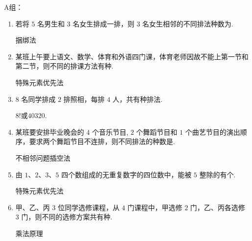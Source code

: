 A组：
\begin{enumerate}

\item 若将 $5$ 名男生和 $3$ 名女生排成一排，则 $3$ 名女生相邻的不同排法种数为.
\begin{jieda}
    捆绑法
\end{jieda}

\item 某班上午要上语文、数学、体育和外语四门课，体育老师因故不能上第一节和第二节，则不同的排课方法有种.
\begin{jieda}
    特殊元素优先法
\end{jieda}


\item $8$ 名同学排成 $2$ 排照相，每排 $4$ 人，共有种排法.
\begin{jieda}
    $8!$或$40320$.
\end{jieda}

\item 某班要安排毕业晚会的 $4$ 个音乐节目, $2$ 个舞蹈节目和 $1$ 个曲艺节目的演出顺序，要求两个舞蹈节目不连排，则不同排法的种数是.
\begin{jieda}
    不相邻问题插空法
\end{jieda}

\item 由 $1$、$2$、$3$、$5$ 四个数组成的无重复数字的四位数中，能被 $5$ 整除的有个.
\begin{jieda}
    特殊元素优先法
\end{jieda}

\item 甲、乙、丙 $3$ 位同学选修课程，从 $4$ 门课程中，甲选修 $2$ 门，乙、丙各选修 $3$ 门，则不同的选修方案共有种.
\begin{jieda}
    乘法原理
\end{jieda}
    
\end{enumerate}


